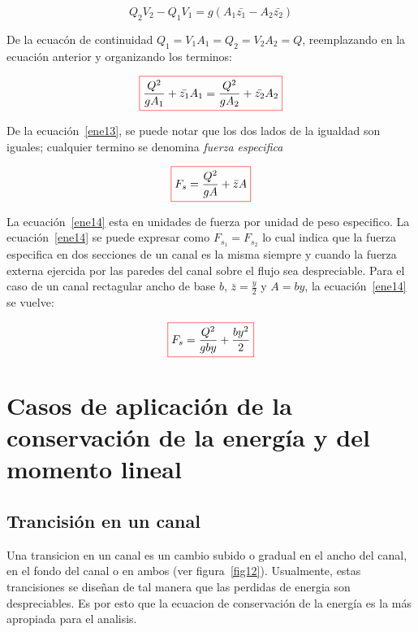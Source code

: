 \documentclass[11pt, oneside]{article}
\begin{document}
\begin{equation}
Q_2 V_2 - Q_1 V_1 = g \left( A_1 \bar{z_1} - A_2 \bar{z_2} \right)
\label{ene12}
\end{equation}

De la ecuac\'on de continuidad $Q_1 = V_1 A_1 = Q_2 = V_2 A_2 = Q$, reemplazando en la ecuaci\'on anterior y organizando los terminos:

\begin{equation}
\color{red}\boxed{\color{black}\frac{Q^2}{g A_1} + \bar{z_1}A_1 = \frac{Q^2}{g A_2} + \bar{z_2}A_2 }
\label{ene13}
\end{equation}

De la ecuaci\'on~\ref{ene13}, se puede notar que los dos lados de la igualdad son iguales; cualquier termino se denomina \emph{fuerza especifica}

\begin{equation}
\color{red}\boxed{\color{black} F_s = \frac{Q^2}{g A} + \bar{z}A  }
\label{ene14}
\end{equation}

La ecuaci\'on~\ref{ene14} esta en unidades de fuerza por unidad de peso especifico. La ecuaci\'on~\ref{ene14} se puede expresar como $F_{s_1} = F_{s_2}$ lo cual indica que la fuerza especifica en dos secciones de un canal es la misma siempre y cuando la fuerza externa ejercida por las paredes del canal sobre el flujo sea despreciable. Para el caso de un canal rectagular ancho de base $b$, $\bar{z} = \frac{y}{2}$ y $A=by$, la ecuaci\'on~\ref{ene14} se vuelve:

\begin{equation}
\color{red}\boxed{\color{black} F_s = \frac{Q^2}{g by} + \frac{by^2}{2} }
\label{ene15}
\end{equation}

\section{Casos de aplicaci\'on de la conservaci\'on de la energ\'ia y del momento lineal}
\subsection{Trancisi\'on en un canal}
Una transicion en un canal es un cambio subido o gradual en el ancho del canal, en el fondo del canal o en ambos (ver figura~\ref{fig12}). Usualmente, estas trancisiones se diseñan de tal manera que las perdidas de energia son despreciables. Es por esto que la ecuacion de conservaci\'on de la energ\'ia es la m\'as apropiada para el analisis. 
\end{document}
